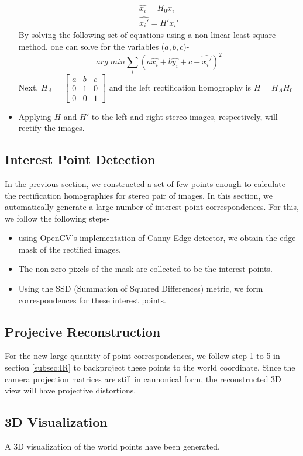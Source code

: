 \documentclass{article}
\begin{document}
\begin{itemize}
\begin{eqnarray}
	\hat{x_i} = H_0x_i\\
	\hat{x_i'} = H'x_i'
\end{eqnarray}
By solving the following set of equations using a non-linear least square method, one can solve for the variables ($a,b,c$)-
\begin{equation}
	arg \; min \sum_i^{}(a\hat{x_i} + b\hat{y_i} + c -\hat{x_i'})^2
\end{equation}
Next, $H_A = \begin{bmatrix}a & b & c \\ 0 & 1 & 0 \\ 0 & 0 & 1\end{bmatrix}$ and the left rectification homography is $H = H_AH_0$
\item Applying $H$ and $H'$ to the left and right stereo images, respectively, will rectify the images.
\end{itemize}

\subsection{Interest Point Detection}
In the previous section, we constructed a set of few points enough to calculate the rectification homographies for stereo pair of images. In this section, we automatically generate a large number of interest point correspondences. For this, we follow the following steps-
\begin{itemize}
\item using OpenCV's implementation of Canny Edge detector, we obtain the edge mask of the rectified images.
\item The non-zero pixels of the mask are collected to be the interest points.
\item Using the SSD (Summation of Squared Differences) metric, we form correspondences for these interest points.
\end{itemize}

\subsection{Projecive Reconstruction}
For the new large quantity of point correspondences, we follow step 1 to 5 in section \ref{subsec:IR} to backproject these points to the world coordinate. Since the camera projection matrices are still in cannonical form, the reconstructed 3D view will have projective distortions.

\subsection{3D Visualization}
A 3D visualization of the world points have been generated.
\end{document}
